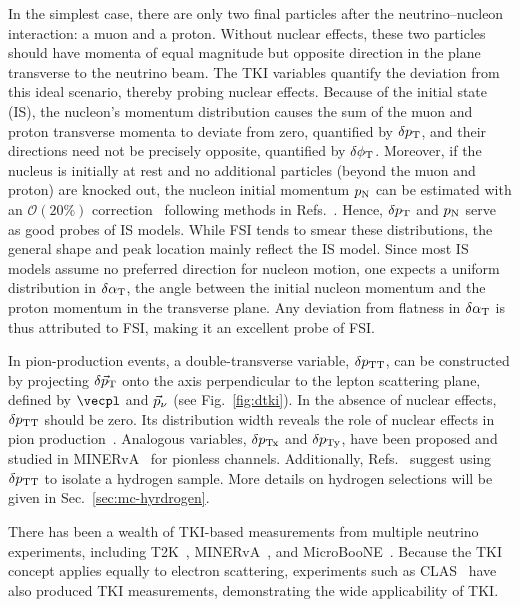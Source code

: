 In the simplest case, there are only two final particles after the neutrino–nucleon interaction: a muon and a proton. 
Without nuclear effects, these two particles should have momenta of equal magnitude but opposite direction in the plane transverse to the neutrino beam.
The TKI variables quantify the deviation from this ideal scenario, thereby probing nuclear effects. 
Because of the initial state (IS), the nucleon’s momentum distribution causes the sum of the muon and proton transverse momenta to deviate from zero, quantified by $\delta p_\textrm{T}$, and their directions need not be precisely opposite, quantified by $\delta\phi_\textrm{T}$.
Moreover, if the nucleus is initially at rest and no additional particles (beyond the muon and proton) are knocked out, the nucleon initial momentum $p_\textrm{N}$ can be estimated with an $\mathcal{O}(20\%)$ correction~\cite{Yang:2023dxk} following methods in Refs.~\cite{Furmanski:2016wqo, Lu:2019nmf}. 
Hence, $\delta p_\textrm{T}$ and $p_\textrm{N}$ serve as good probes of IS models.
While FSI tends to smear these distributions, the general shape and peak location mainly reflect the IS model.
Since most IS models assume no preferred direction for nucleon motion, one expects a uniform distribution in $\delta\alpha_\textrm{T}$, the angle between the initial nucleon momentum and the proton momentum in the transverse plane.
Any deviation from flatness in $\delta\alpha_\textrm{T}$ is thus attributed to FSI, making it an excellent probe of FSI. 

In pion-production events, a double-transverse variable, $\delta p_\textrm{TT}$, can be constructed by projecting $\delta \vec{p}_\textrm{T}$ onto the axis perpendicular to the lepton scattering plane, defined by $\vecpl$ and $\vec{p}_{\nu}$ (see Fig.~\ref{fig:dtki}).
In the absence of nuclear effects, $\delta p_\textrm{TT}$ should be zero.
Its distribution width reveals the role of nuclear effects in pion production~\cite{MINERvA:2020anu, T2K:2021naz}.
Analogous variables, $\delta p_\textrm{Tx}$ and $\delta p_\textrm{Ty}$, have been proposed and studied in MINERvA~\cite{MINERvA:2019ope} for pionless channels.
Additionally, Refs.~\cite{Lu:2015tcr,Hamacher-Baumann:2020ogq} suggest using $\delta p_\textrm{TT}$ to isolate a hydrogen sample.  
More details on hydrogen selections will be given in Sec.~\ref{sec:mc-hyrdrogen}.

There has been a wealth of TKI-based measurements from multiple neutrino experiments, including T2K~\cite{T2K:2018rnz, T2K:2021naz}, MINERvA~\cite{MINERvA:2018hba, MINERvA:2019ope, MINERvA:2020anu, MINERvA:2021csy}, and MicroBooNE~\cite{MicroBooNE:2022emb, MicroBooNE:2023cmw, MicroBooNE:2023tzj, MicroBooNE:2023wzy, MicroBooNE:2024tmp}.
Because the TKI concept applies equally to electron scattering, experiments such as CLAS~\cite{CLAS:2021neh} have also produced TKI measurements, demonstrating the wide applicability of TKI.
